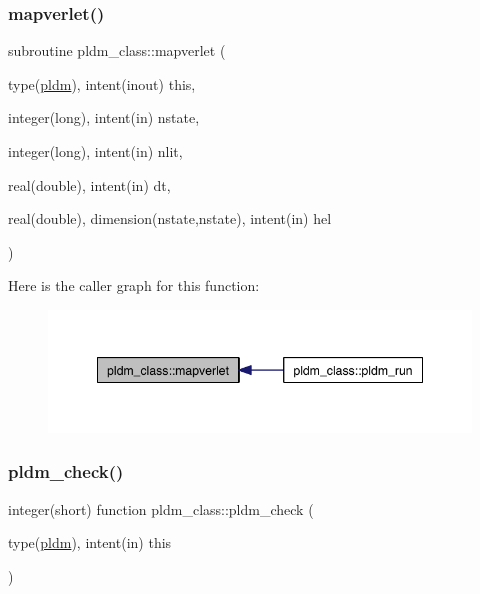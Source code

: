 \subsubsection{\texorpdfstring{mapverlet()}{mapverlet()}}
{\footnotesize\ttfamily subroutine pldm\+\_\+class\+::mapverlet (\begin{DoxyParamCaption}\item[{type(\hyperlink{structpldm__class_1_1pldm}{pldm}), intent(inout)}]{this,  }\item[{integer(long), intent(in)}]{nstate,  }\item[{integer(long), intent(in)}]{nlit,  }\item[{real(double), intent(in)}]{dt,  }\item[{real(double), dimension(nstate,nstate), intent(in)}]{hel }\end{DoxyParamCaption})\hspace{0.3cm}{\ttfamily [private]}}

Here is the caller graph for this function\+:\nopagebreak
\begin{figure}[H]
\begin{center}
\leavevmode
\includegraphics[width=346pt]{namespacepldm__class_a56bc2a02f61ba7f0ef59c429a9f1e038_icgraph}
\end{center}
\end{figure}
\mbox{\label{namespacepldm__class_a87937cd139205ea96672b513c5124b8f}} 
\subsubsection{\texorpdfstring{pldm\+\_\+check()}{pldm\_check()}}
{\footnotesize\ttfamily integer(short) function pldm\+\_\+class\+::pldm\+\_\+check (\begin{DoxyParamCaption}\item[{type(\hyperlink{structpldm__class_1_1pldm}{pldm}), intent(in)}]{this }\end{DoxyParamCaption})\hspace{0.3cm}{\ttfamily [private]}}

